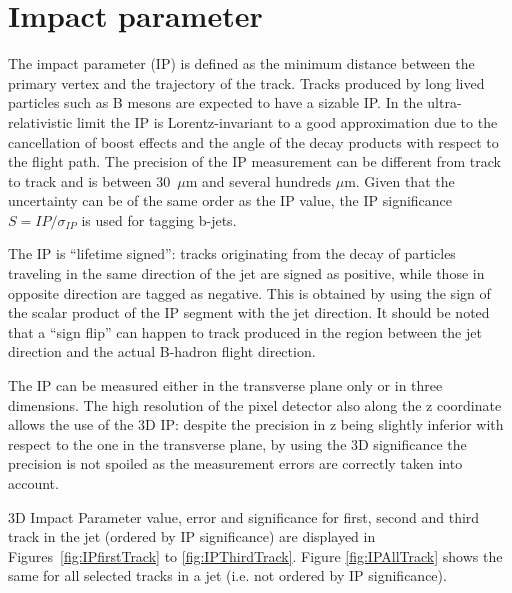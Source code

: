 \clearpage
\section{Impact parameter \label{sec:impactparameter}}
The impact parameter (IP) is defined as the minimum distance between
the primary vertex and the trajectory of the track. Tracks produced by
long lived particles such as B mesons are expected to have a sizable
IP.  In the ultra-relativistic limit the IP is Lorentz-invariant to a
good approximation due to the cancellation of boost effects and the
angle of the decay products with respect to the flight path. The
precision of the IP measurement can be different from track to track
and is between 30~$\mu$m and several hundreds $\mu$m. Given that the
uncertainty can be of the same order as the IP value, the IP
significance $S= IP/\sigma_{IP}$ is used for tagging b-jets. 

The IP is ``lifetime signed'': tracks originating from the decay of
particles traveling in the same direction of the jet are signed as
positive, while those in opposite direction are tagged as
negative. This is obtained by using the sign of the scalar product of
the IP segment with the jet direction. It should be noted that a ``sign
flip'' can happen to track produced in the region between the jet
direction and the actual B-hadron flight direction. 


The IP can be measured either in the transverse plane only or in three
dimensions. The high resolution of the pixel detector also along the z
coordinate allows the use of the 3D IP: despite the precision in z being slightly inferior with respect to the one in the
transverse plane, by using the 3D significance the precision is not 
spoiled as the measurement errors are correctly taken into account.   
 

3D Impact Parameter value, error and significance for first, second and
third track in the jet (ordered by IP significance) are displayed in
Figures~\ref{fig:IPfirstTrack} to \ref{fig:IPThirdTrack}. Figure
\ref{fig:IPAllTrack} shows the same for all selected tracks in a jet
(i.e. not ordered by IP significance).

